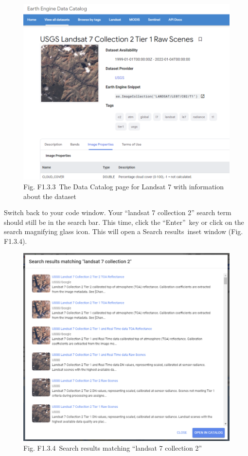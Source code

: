 \documentclass[
  letterpaper,
  DIV=11,
  numbers=noendperiod]{scrreprt}
\begin{document}
\begin{figure}

{\centering \includegraphics{./F1/image31.png}

}

\caption{Fig. F1.3.3~The Data Catalog page for Landsat 7 with
information about the dataset}

\end{figure}

Switch back to your code window. Your ``landsat 7 collection 2'' search
term should still be in the search bar. This time, click the
``Enter''~key or click on the search magnifying glass icon. This will
open a Search results~inset window (Fig. F1.3.4).

\begin{figure}

{\centering \includegraphics{./F1/image11.png}

}

\caption{Fig. F1.3.4~Search results matching ``landsat 7 collection 2''}

\end{figure}
\end{document}

